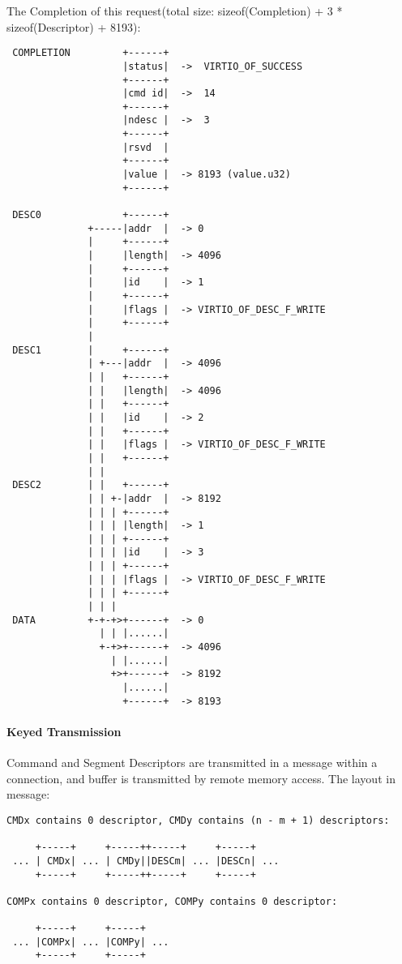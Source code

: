 The Completion of this request(total size: sizeof(Completion) +
3 * sizeof(Descriptor) + 8193):
\begin{lstlisting}
 COMPLETION         +------+
                    |status|  ->  VIRTIO_OF_SUCCESS
                    +------+
                    |cmd id|  ->  14
                    +------+
                    |ndesc |  ->  3
                    +------+
                    |rsvd  |
                    +------+
                    |value |  -> 8193 (value.u32)
                    +------+

 DESC0              +------+
              +-----|addr  |  -> 0
              |     +------+
              |     |length|  -> 4096
              |     +------+
              |     |id    |  -> 1
              |     +------+
              |     |flags |  -> VIRTIO_OF_DESC_F_WRITE
              |     +------+
              |
 DESC1        |     +------+
              | +---|addr  |  -> 4096
              | |   +------+
              | |   |length|  -> 4096
              | |   +------+
              | |   |id    |  -> 2
              | |   +------+
              | |   |flags |  -> VIRTIO_OF_DESC_F_WRITE
              | |   +------+
              | |
 DESC2        | |   +------+
              | | +-|addr  |  -> 8192
              | | | +------+
              | | | |length|  -> 1
              | | | +------+
              | | | |id    |  -> 3
              | | | +------+
              | | | |flags |  -> VIRTIO_OF_DESC_F_WRITE
              | | | +------+
              | | |
 DATA         +-+-+>+------+  -> 0
                | | |......|
                +-+>+------+  -> 4096
                  | |......|
                  +>+------+  -> 8192
                    |......|
                    +------+  -> 8193
\end{lstlisting}

\paragraph{Keyed Transmission}\label{sec:Virtio Transport Options / Virtio Over Fabrics / Transmission Protocol / Commands Definition / Keyed Transmission}
Command and Segment Descriptors are transmitted in a message within a
connection, and buffer is transmitted by remote memory access.  The layout in message:

\begin{lstlisting}
CMDx contains 0 descriptor, CMDy contains (n - m + 1) descriptors:

     +-----+     +-----++-----+     +-----+
 ... | CMDx| ... | CMDy||DESCm| ... |DESCn| ...
     +-----+     +-----++-----+     +-----+

COMPx contains 0 descriptor, COMPy contains 0 descriptor:

     +-----+     +-----+
 ... |COMPx| ... |COMPy| ...
     +-----+     +-----+
\end{lstlisting}

